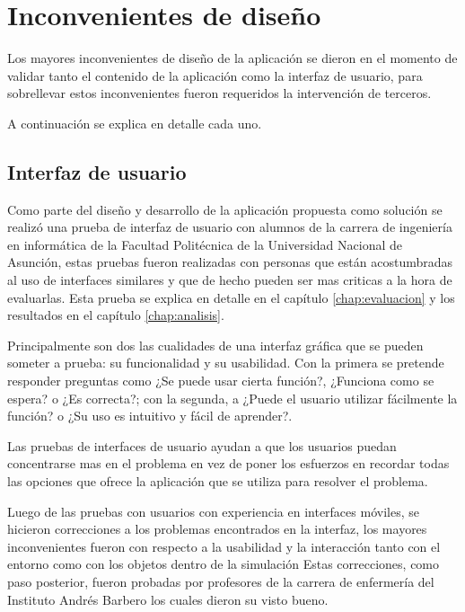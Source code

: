 \section{Inconvenientes de diseño}

Los mayores inconvenientes de diseño de la aplicación se dieron en el momento de validar tanto el contenido de la aplicación como la interfaz de usuario, para sobrellevar estos inconvenientes fueron requeridos la intervención de terceros.

A continuación se explica en detalle cada uno.


\subsection{Interfaz de usuario}

Como parte del diseño y desarrollo de la aplicación propuesta como solución se realizó una prueba de interfaz
de usuario con alumnos de la carrera de ingeniería en informática de la Facultad Politécnica de la Universidad Nacional de Asunción, estas pruebas fueron realizadas con personas que están acostumbradas al uso de interfaces similares y que de hecho pueden ser mas criticas a la hora de evaluarlas. Esta prueba se explica en detalle en el capítulo \ref{chap:evaluacion} y los resultados en el capítulo \ref{chap:analisis}.

Principalmente son dos las cualidades de una interfaz gráfica que se pueden someter a prueba: su funcionalidad y su usabilidad. Con la primera se pretende responder preguntas como ¿Se puede usar cierta función?, ¿Funciona como se espera? o ¿Es correcta?; con la segunda, a ¿Puede el usuario utilizar fácilmente la función? o ¿Su uso es intuitivo y fácil de aprender?\cite{fragaverificacion}.

Las pruebas de interfaces de usuario ayudan a que los usuarios puedan concentrarse mas en el problema en vez de poner los esfuerzos en recordar todas las opciones que ofrece la aplicación que se utiliza para resolver el problema\cite{horowitz1993graphical}.

Luego de las pruebas con usuarios con experiencia en interfaces móviles, se hicieron correcciones a los problemas encontrados en la interfaz, los mayores inconvenientes fueron con respecto a la usabilidad y la interacción tanto con el entorno como con los objetos dentro de la simulación Estas correcciones, como paso posterior, fueron probadas por profesores de la carrera de enfermería del Instituto Andrés Barbero los cuales dieron su visto bueno.


